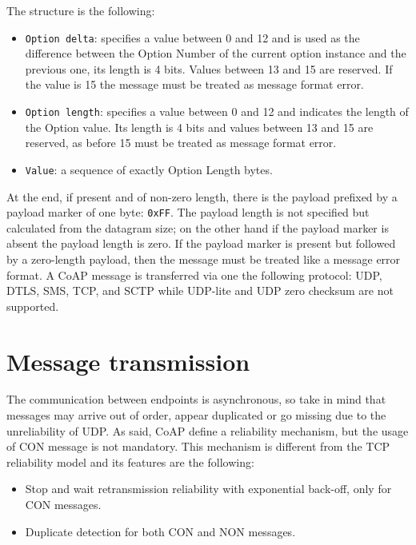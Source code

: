 	The structure is the following:\newline
	\begin{itemize}
		\item \texttt{Option delta}: specifies a value between 0 and 12 and is used as the difference between the Option Number of the current option instance and the previous one, its length is 4 bits.
		Values between 13 and 15 are reserved.
		If the value is 15 the message must be treated as message format error.
		\item \texttt{Option length}: specifies a value between 0 and 12 and indicates the length of the Option value.
		Its length is 4 bits and values between 13 and 15 are reserved, as before 15 must be treated as message format error.
		\item \texttt{Value}: a sequence of exactly Option Length bytes.
	\end{itemize}

	At the end, if present and of non-zero length, there is the payload prefixed by a payload marker of one byte: \texttt{0xFF}.\newline
	The payload length is not specified but calculated from the datagram size; on the other hand if the payload marker is absent the payload length is zero.\newline
	If the payload marker is present but followed by a zero-length payload, then the message must be treated like a message error format.\newline
	A CoAP message is transferred via one the following protocol: UDP, DTLS, SMS, TCP, and SCTP while UDP-lite and UDP zero checksum are not supported.\newline

	
	\section{Message transmission}
	The communication between endpoints is asynchronous, so take in mind that messages may arrive out of order, appear duplicated or go missing due to the unreliability of UDP.\newline
	As said, CoAP define a reliability mechanism, but the usage of CON message is not mandatory. This mechanism is different from the TCP reliability model and its features are the following:\newline
	\begin{itemize}
		\item Stop and wait retransmission reliability with exponential back-off, only for CON messages.
		\item Duplicate detection for both CON and NON messages.
	\end{itemize}

